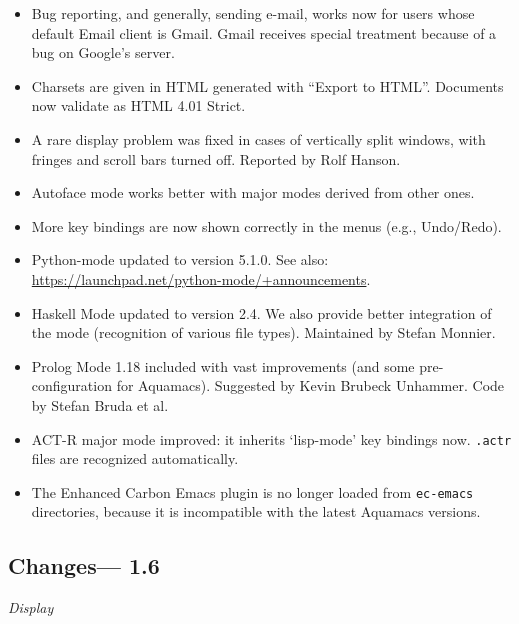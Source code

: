 \begin{itemize}
\item Bug reporting, and generally, sending e-mail, works now for users whose default Email client is Gmail.  Gmail receives special treatment because of a bug on Google's server.

\item Charsets are given in HTML generated with ``Export to HTML''.  Documents now validate as HTML 4.01 Strict.

\item A rare display problem was fixed in cases of vertically split windows, with fringes and scroll bars turned off.
Reported by Rolf Hanson.

\item Autoface mode works better with major modes derived from other ones.

\item More key bindings are now shown correctly in the menus (e.g., Undo/Redo).

\item Python-mode updated to version 5.1.0.  See also: \url{https://launchpad.net/python-mode/+announcements}.

\item Haskell Mode updated to version 2.4.   We also provide better integration of the mode (recognition of various file types).
Maintained by Stefan Monnier.

\item Prolog Mode 1.18 included with vast improvements (and some pre-configuration for Aquamacs).
Suggested by Kevin Brubeck Unhammer.  Code by Stefan Bruda et al.

\item ACT-R major mode improved: it inherits `lisp-mode' key bindings now.  {\tt .actr} files are recognized automatically.

\item The Enhanced Carbon Emacs plugin is no longer loaded from {\tt ec-emacs} directories, because it is incompatible with the latest Aquamacs versions.


\end{itemize}

\subsection{Changes--- 1.6}

\emph{Display}


